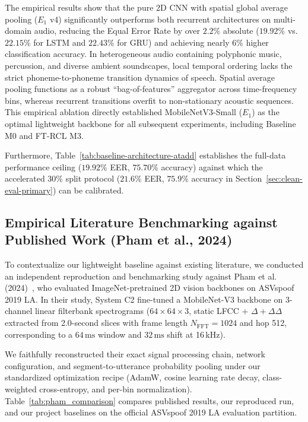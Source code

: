 The empirical results show that the pure 2D CNN with spatial global average pooling ($E_1$ v4) significantly outperforms both recurrent architectures on multi-domain audio, reducing the Equal Error Rate by over $2.2\%$ absolute ($19.92\%$ vs. $22.15\%$ for LSTM and $22.43\%$ for GRU) and achieving nearly $6\%$ higher classification accuracy. In heterogeneous audio containing polyphonic music, percussion, and diverse ambient soundscapes, local temporal ordering lacks the strict phoneme-to-phoneme transition dynamics of speech. Spatial average pooling functions as a robust ``bag-of-features'' aggregator across time-frequency bins, whereas recurrent transitions overfit to non-stationary acoustic sequences. This empirical ablation directly established MobileNetV3-Small ($E_1$) as the optimal lightweight backbone for all subsequent experiments, including Baseline M0 and FT-RCL M3.

Furthermore, Table~\ref{tab:baseline-architecture-atadd} establishes the full-data performance ceiling ($19.92\%$ EER, $75.70\%$ accuracy) against which the accelerated 30\% split protocol ($21.6\%$ EER, $75.9\%$ accuracy in Section~\ref{sec:clean-eval-primary}) can be calibrated.

\subsection{Empirical Literature Benchmarking against Published Work (Pham et al., 2024)}
\label{subsec:pham-comparison}

To contextualize our lightweight baseline against existing literature, we conducted an independent reproduction and benchmarking study against Pham et al. (2024)~\cite{pham2024deepfake}, who evaluated ImageNet-pretrained 2D vision backbones on ASVspoof 2019 LA. In their study, System C2 fine-tuned a MobileNet-V3 backbone on 3-channel linear filterbank spectrograms ($64 \times 64 \times 3$, static LFCC + $\Delta + \Delta\Delta$ extracted from 2.0-second slices with frame length $N_{\mathrm{FFT}} = 1024$ and hop 512, corresponding to a $64\,\text{ms}$ window and $32\,\text{ms}$ shift at 16\,kHz).

We faithfully reconstructed their exact signal processing chain, network configuration, and segment-to-utterance probability pooling under our standardized optimization recipe (AdamW, cosine learning rate decay, class-weighted cross-entropy, and per-bin normalization). Table~\ref{tab:pham_comparison} compares published results, our reproduced run, and our project baselines on the official ASVspoof 2019 LA evaluation partition.

